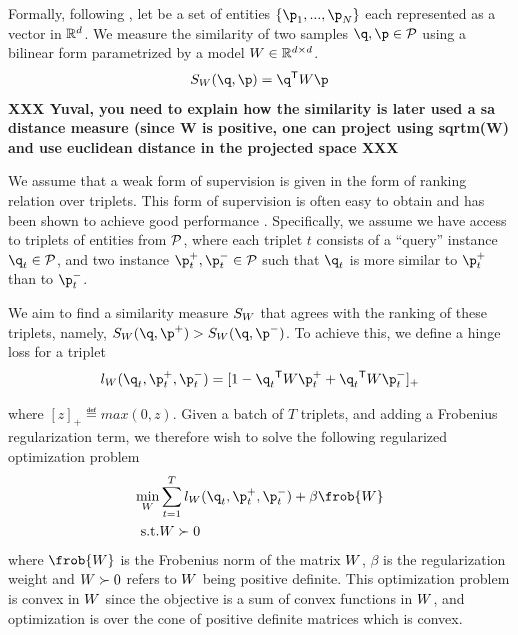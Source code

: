 \documentclass{article}
\begin{document}
Formally, following \cite{OASIS}, let  be a set of entities
$\{\p_1,...,\p_N\}$ each represented as a vector in $\mathbb{R}^d$.  We measure
the similarity of two samples $\q, \p \in \cal{P}$ using a bilinear
form parametrized by a model ${W} \in \mathbb{R}^{d \times d}$.
\begin{equation}
  S_{\W}(\q, \p) = \q\T \W \p
\end{equation}
\newline
{\bf{XXX Yuval, you need to explain how the similarity is later used a sa
distance measure (since W is positive, one can project using sqrtm(W)
and use euclidean distance in the projected space  XXX }}
\newline

We assume that a weak form of supervision is given in the form of
ranking relation over triplets. This form of supervision is often easy
to obtain and has been shown to achieve good performance
\cite{lmnn,oasis,qian}. Specifically, we assume we have access to
triplets of entities from $\cal{P}$, where each triplet $t$ consists of
a ``query'' instance $\q_{t} \in \cal{P}$, and two instance $\p_{t}^{+},
\p_{t}^{-} \in \cal{P}$ such that $\q_t$ is more similar to $\p_t^+$
than to $\p_t^-$.

We aim to find a similarity measure $S_{{W}}$ that agrees with the
ranking of these triplets, namely, $S_{\W}(\q, \p^+) > S_{\W}(\q,
\p^-)$. To achieve this, we define a hinge loss for a triplet
\begin{equation}
  l_{\W}(\q_t, \p_t^{+}, \p_t^{-})=[1-\q_t\T \W \p_t^{+}+\q_t\T\W\p_t^{-}]_{+}
  \label{hingelt}
\end{equation}

where $[z]_{+} \eqdef max(0,z)$.  Given a batch of $T$ triplets, and
adding a Frobenius regularization term, we therefore wish to solve the
following regularized optimization problem
\begin{eqnarray}
  \min_{\W}& \sum_{t=1}^T  l_{\W}(\q_t, \p_t^{+}, \p_t^{-}) + \beta \frob{\W}
 \\  \nonumber
   \rm{s.t.}& \W \succ 0
  \label{hingelt}
\end{eqnarray}
where $\frob{\W}$ is the Frobenius norm of the matrix ${W}$, $\beta$ is
the regularization weight and ${W} \succ 0$ refers to ${W}$ being
positive definite. This optimization problem is convex in ${W}$ since
the objective is a sum of convex functions in ${W}$, and optimization
is over the cone of positive definite matrices which is convex.
\end{document}
